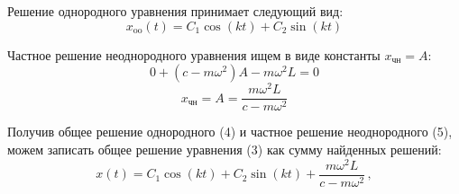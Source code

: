 \documentclass{article}
\begin{document}
Решение однородного уравнения принимает следующий вид:
\begin{equation}
	x_{\text{oo}}(t) = C_1 \cos(kt) + C_2 \sin(kt)
\end{equation}

Частное решение неоднородного уравнения ищем в виде константы $x_{\text{чн}} = A$:
\begin{equation*}
	0 + (c - m\omega^2)A - m\omega^2 L = 0
\end{equation*}
\begin{equation*}
	x_{\text{чн}} = A = \frac{m\omega^2 L}{c - m\omega^2}
\end{equation*}

Получив общее решение однородного (4) и частное решение неоднородного (5), можем записать общее решение уравнения (3) как сумму найденных решений:
\begin{equation}
	\boxed{x(t) = C_1 \cos(kt) + C_2 \sin(kt) + \frac{m\omega^2 L}{c - m\omega^2}} \, ,
\end{equation}
\end{document}
